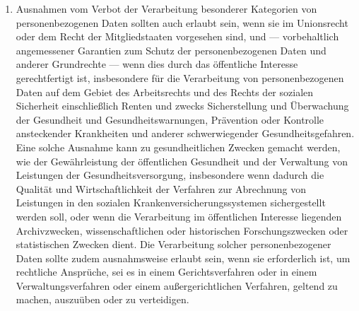 \begin{enumerate}
   \item Ausnahmen vom Verbot der Verarbeitung besonderer Kategorien von personenbezogenen Daten sollten auch erlaubt
    sein, wenn sie im Unionsrecht oder dem Recht der Mitgliedstaaten vorgesehen sind, und — vorbehaltlich angemessener
    Garantien zum Schutz der personenbezogenen Daten und anderer Grundrechte — wenn dies durch das öffentliche
    Interesse gerechtfertigt ist, insbesondere für die Verarbeitung von personenbezogenen Daten auf dem Gebiet des
    Arbeitsrechts und des Rechts der sozialen Sicherheit einschließlich Renten und zwecks Sicherstellung und
    Überwachung der Gesundheit und Gesundheitswarnungen, Prävention oder Kontrolle ansteckender Krankheiten und anderer
    schwerwiegender Gesundheitsgefahren. Eine solche Ausnahme kann zu gesundheitlichen Zwecken gemacht werden, wie der
    Gewährleistung der öffentlichen Gesundheit und der Verwaltung von Leistungen der Gesundheitsversorgung,
    insbesondere wenn dadurch die Qualität und Wirtschaftlichkeit der Verfahren zur Abrechnung von Leistungen in den
    sozialen Krankenversicherungssystemen sichergestellt werden soll, oder wenn die Verarbeitung im öffentlichen
    Interesse liegenden Archivzwecken, wissenschaftlichen oder historischen Forschungszwecken oder statistischen
    Zwecken dient. Die Verarbeitung solcher personenbezogener Daten sollte zudem ausnahmsweise erlaubt sein, wenn sie
    erforderlich ist, um rechtliche Ansprüche, sei es in einem Gerichtsverfahren oder in einem Verwaltungsverfahren
    oder einem außergerichtlichen Verfahren, geltend zu machen, auszuüben oder zu verteidigen.%
   \label{itm:eg-52}
   


\end{enumerate}
